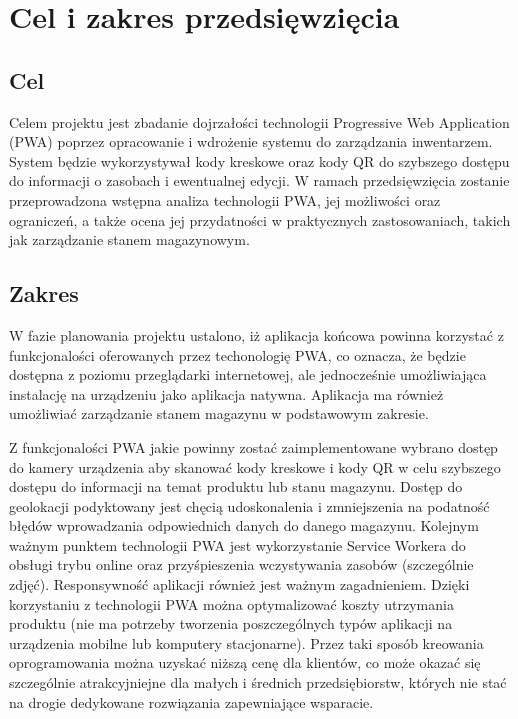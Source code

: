 \documentclass[../main.tex]{subfiles}
\begin{document}
\section{Cel i zakres przedsięwzięcia}
    \subsection{Cel}    
    Celem projektu jest zbadanie dojrzałości technologii Progressive Web Application (PWA) poprzez opracowanie i wdrożenie systemu do zarządzania inwentarzem. System będzie wykorzystywał kody kreskowe oraz kody QR do szybszego dostępu do informacji o zasobach i ewentualnej edycji. W ramach przedsięwzięcia zostanie przeprowadzona wstępna analiza technologii PWA, jej możliwości oraz ograniczeń, a także ocena jej przydatności w praktycznych zastosowaniach, takich jak zarządzanie stanem magazynowym.
        

    \subsection{Zakres}
        W fazie planowania projektu ustalono, iż aplikacja końcowa powinna korzystać z funkcjonalości oferowanych przez techonologię PWA, co oznacza, że będzie dostępna z poziomu przeglądarki internetowej, ale jednocześnie umożliwiająca instalację na urządzeniu jako aplikacja natywna. Aplikacja ma również umożliwiać zarządzanie stanem magazynu w podstawowym zakresie. 

        Z funkcjonalości PWA jakie powinny zostać zaimplementowane wybrano dostęp do kamery urządzenia aby skanować kody kreskowe i kody QR w celu szybszego dostępu do informacji na temat produktu lub stanu magazynu. Dostęp do geolokacji podyktowany jest chęcią udoskonalenia i zmniejszenia na podatność błędów wprowadzania odpowiednich danych do danego magazynu. Kolejnym ważnym punktem technologii PWA jest wykorzystanie Service Workera do obsługi trybu online oraz przyśpieszenia wczystywania zasobów (szczególnie zdjęć). Responsywność aplikacji również jest ważnym zagadnieniem. Dzięki korzystaniu z technologii PWA można optymalizować koszty utrzymania produktu (nie ma potrzeby tworzenia poszczególnych typów aplikacji na urządzenia mobilne lub komputery stacjonarne). Przez taki sposób kreowania oprogramowania można uzyskać niższą cenę dla klientów, co może okazać się szczególnie atrakcyjniejne dla małych i średnich przedsiębiorstw, których nie stać na drogie dedykowane rozwiązania zapewniające wsparacie.

\end{document}
